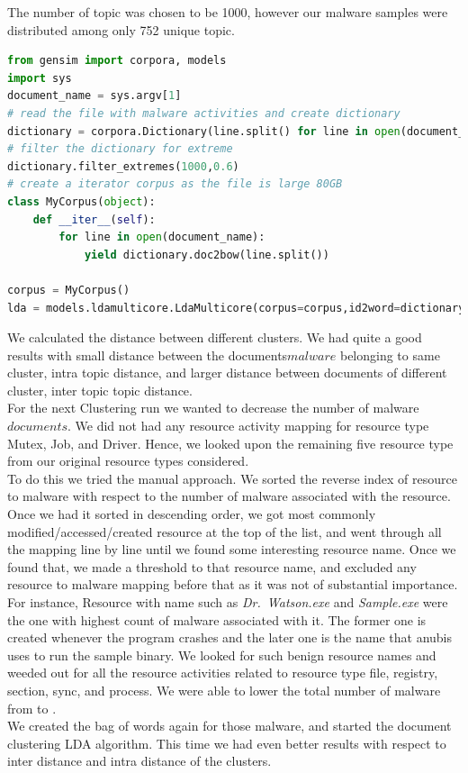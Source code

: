 The number of topic was chosen to be 1000, however our malware samples were distributed among only 752 unique topic.
\begin{lstlisting}[float,floatplacement=H,language=python,caption={Script to run Gensim LDA},label={lbl:lda.py}]
from gensim import corpora, models
import sys
document_name = sys.argv[1]
# read the file with malware activities and create dictionary
dictionary = corpora.Dictionary(line.split() for line in open(document_name))
# filter the dictionary for extreme
dictionary.filter_extremes(1000,0.6)
# create a iterator corpus as the file is large 80GB
class MyCorpus(object):
    def __iter__(self):
        for line in open(document_name):
            yield dictionary.doc2bow(line.split())

corpus = MyCorpus()
lda = models.ldamulticore.LdaMulticore(corpus=corpus,id2word=dictionary,num_topics=1000)
\end{lstlisting}
We calculated the distance between different clusters. We had quite a good results with small distance between the documents\(malware\) belonging to same cluster, intra topic distance, and larger distance between documents of different cluster, inter topic topic distance.
\\
For the next Clustering run we wanted to decrease the number of malware\(documents\).
We did not had any resource activity mapping for resource type Mutex, Job, and Driver. Hence, we looked upon the remaining five resource type from our original resource types considered.\\
To do this we tried the manual approach. We sorted the reverse index of resource to malware with respect to the number of malware associated with the resource.
Once we had it sorted in descending order, we got most commonly modified/accessed/created resource at the top of the list, and went through all the mapping line by line until we found some interesting resource name.
Once we found that, we made a threshold to that resource name, and excluded any resource to malware mapping before that as it was not of substantial importance.\\
For instance, Resource with name such as \emph{Dr.\ Watson.exe} and \emph{Sample.exe} were the one with highest count of malware associated with it. The former one is created whenever the program crashes and the later one is the name that anubis uses to run the sample binary.
We looked for such benign resource names and weeded out for all the resource activities related to resource type file, registry, section, sync, and process. We were able to lower the total number of malware from {\gettotalmalwareii{}} to {\gettotalmalwareiii{}}.\\
We created the bag of words again for those {\gettotalmalwareiii{}} malware, and started the document clustering LDA algorithm. This time we had even better results with respect to inter distance and intra distance of the clusters.

